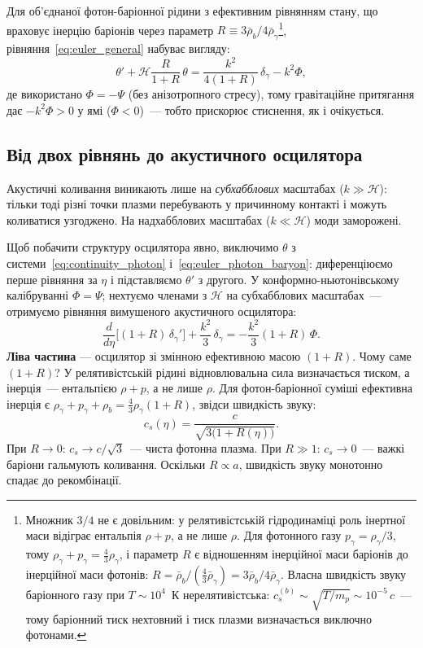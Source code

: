 Для об'єднаної фотон-баріонної рідини з ефективним
рівнянням стану, що враховує інерцію баріонів через
параметр $R \equiv 3\bar\rho_b/4\bar\rho_\gamma$\footnote{%
Множник $3/4$ не є довільним: у релятивістській
гідродинаміці роль інертної маси відіграє ентальпія
$\rho + p$, а не лише $\rho$. Для фотонного газу
$p_\gamma = \rho_\gamma/3$, тому
$\rho_\gamma + p_\gamma = \tfrac{4}{3}\rho_\gamma$,
і параметр $R$ є відношенням інерційної маси баріонів
до інерційної маси фотонів:
$R = \bar\rho_b / (\tfrac{4}{3}\bar\rho_\gamma)
   = 3\bar\rho_b / 4\bar\rho_\gamma$.
Власна швидкість звуку баріонного газу при
$T \sim 10^4$~К нерелятивістська:
$c_s^{(b)} \sim \sqrt{T/m_p} \sim 10^{-5}\,c$~---
тому баріонний тиск нехтовний і тиск плазми
визначається виключно фотонами.%
},
рівняння~\eqref{eq:euler_general} набуває вигляду:
\begin{equation}\label{eq:euler_photon_baryon}
  \theta' + \mathcal{H}\frac{R}{1+R}\,\theta
  = \frac{k^2}{4(1+R)}\,\delta_\gamma - k^2\Phi,
\end{equation}
де використано $\Phi = -\Psi$ (без анізотропного стресу),
тому гравітаційне притягання дає $-k^2\Phi > 0$ у ямі
($\Phi < 0$)~--- тобто прискорює стиснення, як і очікується.

\subsection*{Від двох рівнянь до акустичного осцилятора}

Акустичні коливання виникають лише на \emph{субхабблових}
масштабах ($k \gg \mathcal{H}$): тільки тоді різні точки
плазми перебувають у причинному контакті і можуть
коливатися узгоджено. На надхабблових масштабах
($k \ll \mathcal{H}$) моди заморожені.

Щоб побачити структуру осцилятора явно, виключимо
$\theta$ з системи~\eqref{eq:continuity_photon}
і~\eqref{eq:euler_photon_baryon}: диференціюємо перше
рівняння за $\eta$ і підставляємо $\theta'$ з другого.
У конформно-ньютонівському калібруванні $\Phi = \Psi$;
нехтуємо членами з $\mathcal{H}$ на субхабблових
масштабах~--- отримуємо рівняння вимушеного акустичного
осцилятора:
\begin{equation}\label{eq:acoustic_preview}
  \frac{d}{d\eta}\bigl[(1+R)\,\delta_\gamma'\bigr]
  + \frac{k^2}{3}\,\delta_\gamma
  = -\frac{k^2}{3}(1+R)\,\Phi.
\end{equation}
\textbf{Ліва частина} — осцилятор зі змінною ефективною
масою $(1+R)$.
Чому саме $(1+R)$? У релятивістській рідині
відновлювальна сила визначається тиском, а інерція~---
ентальпією $\rho + p$, а не лише $\rho$.
Для фотон-баріонної суміші ефективна інерція є
$\rho_\gamma + p_\gamma + \rho_b = \tfrac{4}{3}\rho_\gamma(1+R)$,
звідси швидкість звуку:
\begin{equation}\label{eq:sound_speed}
  c_s(\eta) = \frac{c}{\sqrt{3\bigl(1+R(\eta)\bigr)}}.
\end{equation}
При $R \to 0$: $c_s \to c/\sqrt{3}$~--- чиста фотонна
плазма. При $R \gg 1$: $c_s \to 0$~--- важкі баріони
гальмують коливання. Оскільки $R \propto a$, швидкість
звуку монотонно спадає до рекомбінації.

